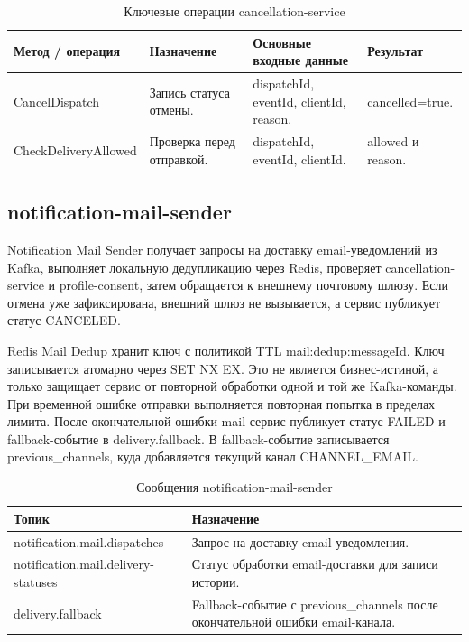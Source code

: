 \begin{table}[H]
    \centering
    \footnotesize
    \renewcommand{\arraystretch}{1.15}
    \caption{Ключевые операции cancellation-service}
    \label{tab:impl-cancellation-api}
    \begin{tabular}{|L{0.24\textwidth}|L{0.28\textwidth}|L{0.24\textwidth}|L{0.16\textwidth}|}
        \hline
        \textbf{Метод / операция} & \textbf{Назначение} & \textbf{Основные входные данные} & \textbf{Результат} \\
        \hline
        CancelDispatch & Запись статуса отмены. & dispatchId, eventId, clientId, reason. & cancelled=true. \\
        \hline
        CheckDeliveryAllowed & Проверка перед отправкой. & dispatchId, eventId, clientId. & allowed и reason. \\
        \hline
    \end{tabular}
\end{table}

\subsection{notification-mail-sender}

Notification Mail Sender получает запросы на доставку email-уведомлений из Kafka, выполняет локальную дедупликацию через Redis, проверяет cancellation-service и profile-consent, затем обращается к внешнему почтовому шлюзу. Если отмена уже зафиксирована, внешний шлюз не вызывается, а сервис публикует статус CANCELED.

Redis Mail Dedup хранит ключ с политикой TTL mail:dedup:{messageId}. Ключ записывается атомарно через SET NX EX. Это не является бизнес-истиной, а только защищает сервис от повторной обработки одной и той же Kafka-команды. При временной ошибке отправки выполняется повторная попытка в пределах лимита. После окончательной ошибки mail-сервис публикует статус FAILED и fallback-событие в delivery.fallback. В fallback-событие записывается previous\_channels, куда добавляется текущий канал CHANNEL\_EMAIL.

\begin{table}[H]
    \centering
    \footnotesize
    \renewcommand{\arraystretch}{1.15}
    \caption{Сообщения notification-mail-sender}
    \label{tab:impl-mail-messages}
    \begin{tabular}{|L{0.34\textwidth}|L{0.56\textwidth}|}
        \hline
        \textbf{Топик} & \textbf{Назначение} \\
        \hline
        notification.mail.dispatches & Запрос на доставку email-уведомления. \\
        \hline
        notification.mail.delivery-statuses & Статус обработки email-доставки для записи истории. \\
        \hline
        delivery.fallback & Fallback-событие с previous\_channels после окончательной ошибки email-канала. \\
        \hline
    \end{tabular}
\end{table}

